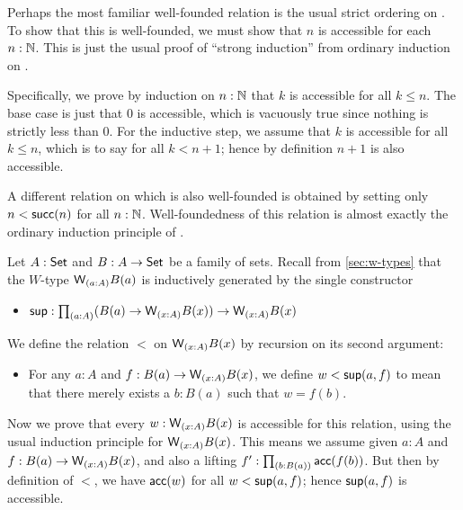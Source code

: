 \documentclass[hott-all.tex]{subfiles}
\begin{document}
\begin{eg}
  Perhaps the most familiar well-founded relation is the usual strict ordering on \nat.
  To show that this is well-founded, we must show that $n$ is accessible for each $n:\mathbb{N}$.
  This is just the usual proof of ``strong induction'' from ordinary induction on \nat.

  Specifically, we prove by induction on $n:\mathbb{N}$ that $k$ is accessible for all $k\le n$.
  The base case is just that $0$ is accessible, which is vacuously true since nothing is strictly less than $0$.
  For the inductive step, we assume that $k$ is accessible for all $k\le n$, which is to say for all $k<n+1$; hence by definition $n+1$ is also accessible.

  A different relation on \nat which is also well-founded is obtained by setting only $n < \mathsf{succ}(n)$ for all $n:\mathbb{N}$.
  Well-foundedness of this relation is almost exactly the ordinary induction principle of \nat.
\end{eg}
% 
\begin{eg}
  Let $A:\mathsf{Set}$ and $B : A \to \mathsf{Set}$ be a family of sets.
  Recall from \cref{sec:w-types} that the $W$-type $\wtype{a:A} B(a)$ is inductively generated by the single constructor
  \begin{itemize}
  \item $\supp : \prd{a:A} (B(a) \to \wtype{x:A} B(x)) \to \wtype{x:A} B(x)$
  \end{itemize}
  We define the relation $<$ on $\wtype{x:A} B(x)$ by recursion on its second argument:
  \begin{itemize}
  \item For any $a:A$ and $f:B(a) \to \wtype{x:A} B(x)$, we define $w<{\mathsf{sup}}(a,f)$ to mean that there merely exists a $b:B(a)$ such that $w = f(b)$.
  \end{itemize}
  Now we prove that every $w:\wtype{x:A} B(x)$ is accessible for this relation, using the usual induction principle for $\wtype{x:A}B(x)$.
  This means we assume given $a:A$ and $f:B(a) \to \wtype{x:A} B(x)$, and also a lifting $f' : \prd{b:B(a)} \acc(f(b))$.
  But then by definition of $<$, we have $\mathsf{acc}(w)$ for all $w<{\mathsf{sup}}(a,f)$; hence ${\mathsf{sup}}(a,f)$ is accessible.
\end{eg}
% 
\end{document}
